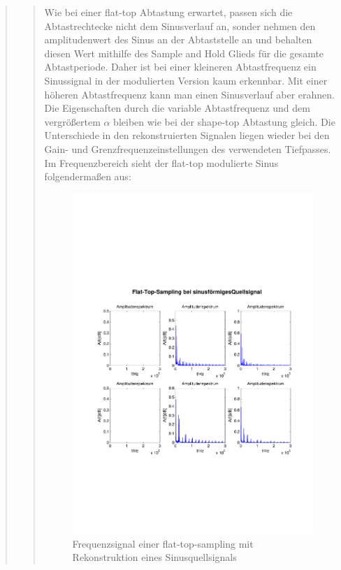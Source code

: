 \begin{quote}
\begin{quote}
           Wie bei einer flat-top Abtastung erwartet, passen sich die
           Abtastrechtecke nicht dem Sinusverlauf an, sonder nehmen den
           amplitudenwert des Sinus an der Abtaststelle an und behalten diesen
           Wert mithilfe des Sample and Hold Glieds für die gesamte
           Abtastperiode. Daher ist bei einer kleineren Abtastfrequenz ein
           Sinussignal in der modulierten Version kaum erkennbar. Mit einer
           höheren Abtastfrequenz kann man einen Sinusverlauf aber erahnen. Die
           Eigenschaften durch die variable Abtastfrequenz und dem vergrößertem
           $\alpha$ bleiben wie bei der shape-top Abtastung gleich. Die
           Unterschiede in den rekonstruierten Signalen liegen wieder bei den
           Gain- und Grenzfrequenzeinstellungen des verwendeten Tiefpasses.\\
           
           Im Frequenzbereich sieht der flat-top modulierte Sinus folgendermaßen
           aus:
           
           \begin{figure}[H]
            \centering
            \includegraphics[scale=0.6, trim = 1.5cm 6cm 1cm 8cm,
            clip]{./Bilder/flat-top-sinus_freq}
                \caption{Frequenzsignal einer flat-top-sampling mit
                Rekonstruktion eines Sinusquellsignals}
      	    \end{figure}
           

\end{quote}
\end{quote}
